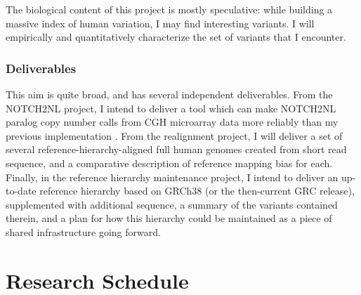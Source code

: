 \documentclass[11pt,proposal]{ucthesis}
\begin{document}
The biological content of this project is mostly speculative: while building a massive index of human variation, I may find interesting variants. I will empirically and quantitatively characterize the set of variants that I encounter.

\subsection{Deliverables}

This aim is quite broad, and has several independent deliverables. From the NOTCH2NL project, I intend to deliver a tool which can make NOTCH2NL paralog copy number calls from CGH microarray data more reliably than my previous implementation \cite{jacobs2014recently}. From the realignment project, I will deliver a set of several reference-hierarchy-aligned full human genomes created from short read sequence, and a comparative description of reference mapping bias for each. Finally, in the reference hierarchy maintenance project, I intend to deliver an up-to-date reference hierarchy based on GRCh38 (or the then-current GRC release), supplemented with additional sequence, a summary of the variants contained therein, and a plan for how this hierarchy could be maintained as a piece of shared infrastructure going forward.




    

\appendix
\chapter{Research Schedule}
\end{document}
